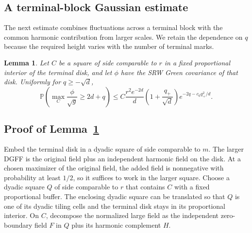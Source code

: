 \documentclass[11pt,a4paper]{article}
\numberwithin{equation}{section}
\newtheorem{lemma}[theorem]{Lemma}
\theoremstyle{remark}
\begin{document}
\subsection{A terminal-block Gaussian estimate}\label{sec:terminalupper}
The next estimate combines fluctuations across a terminal block with the common harmonic contribution from larger scales. We retain the dependence on $q$ because the required height varies with the number of terminal marks.
\begin{lemma}\label{lem:terminalupper}
Let $C$ be a square of side comparable to $r$ in a fixed proportional interior of the terminal disk, and let $\phi$ have the SRW Green covariance of that disk. Uniformly for $q\ge-\sqrt d$,
\begin{equation}\label{eq:4.5}
\mathbb P\left(\max_C\frac{\phi}{\sqrt g}\ge2d+q\right)
\le C\frac{r^2e^{-2d}}d
\left(1+\frac{q_+}{\sqrt d}\right)e^{-2q-c_0q_+^2/d}.
\end{equation}
\end{lemma}

\subsection{Proof of Lemma~\ref{lem:terminalupper}}\label{sec:terminalupperproof}
Embed the terminal disk in a dyadic square of side comparable to $m$. The larger DGFF is the original field plus an independent harmonic field on the disk. At a chosen maximizer of the original field, the added field is nonnegative with probability at least $1/2$, so it suffices to work in the larger square. Choose a dyadic square $Q$ of side comparable to $r$ that contains $C$ with a fixed proportional buffer. The enclosing dyadic square can be translated so that $Q$ is one of its dyadic tiling cells and the terminal disk stays in its proportional interior. On $C$, decompose the normalized large field as the independent zero-boundary field $F$ in $Q$ plus its harmonic complement $H$.
\end{document}

